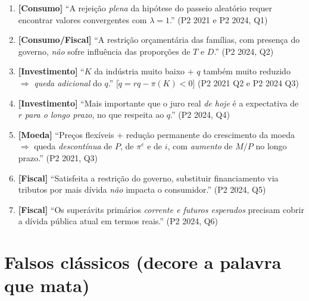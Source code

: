 \documentclass[12pt, a4paper]{article}
\begin{document}
\begin{correctbox}[title={Se aparecer parecido com isto, é V}]
\begin{enumerate}[leftmargin=1.6em, itemsep=0.35em]
\item \textbf{[Consumo]} ``A rejeição \emph{plena} da hipótese do passeio
aleatório requer encontrar valores convergentes com $\lambda = 1$.''
\hfill{\footnotesize (P2 2021 e P2 2024, Q1)}
\item \textbf{[Consumo/Fiscal]} ``A restrição orçamentária das famílias, com
presença do governo, \emph{não} sofre influência das proporções de $T$ e $D$.''
\hfill{\footnotesize (P2 2024, Q2)}
\item \textbf{[Investimento]} ``$K$ da indústria muito baixo $+$ $q$ também
muito reduzido $\Rightarrow$ \emph{queda adicional} do $q$.''
[$\dot q = rq - \pi(K) < 0$]
\hfill{\footnotesize (P2 2021 Q2 e P2 2024 Q3)}
\item \textbf{[Investimento]} ``Mais importante que o juro real \emph{de hoje}
é a expectativa de $r$ \emph{para o longo prazo}, no que respeita ao $q$.''
\hfill{\footnotesize (P2 2024, Q4)}
\item \textbf{[Moeda]} ``Preços flexíveis $+$ redução permanente do
crescimento da moeda $\Rightarrow$ queda \emph{descontínua} de $P$, de
$\pi^e$ e de $i$, com \emph{aumento} de $M/P$ no longo prazo.''
\hfill{\footnotesize (P2 2021, Q3)}
\item \textbf{[Fiscal]} ``Satisfeita a restrição do governo, substituir
financiamento via tributos por mais dívida \emph{não} impacta o consumidor.''
\hfill{\footnotesize (P2 2024, Q5)}
\item \textbf{[Fiscal]} ``Os superávits primários \emph{corrente e futuros
esperados} precisam cobrir a dívida pública atual em termos reais.''
\hfill{\footnotesize (P2 2024, Q6)}
\end{enumerate}
\end{correctbox}

\section{Falsos clássicos (decore a palavra que mata)}
\end{document}
